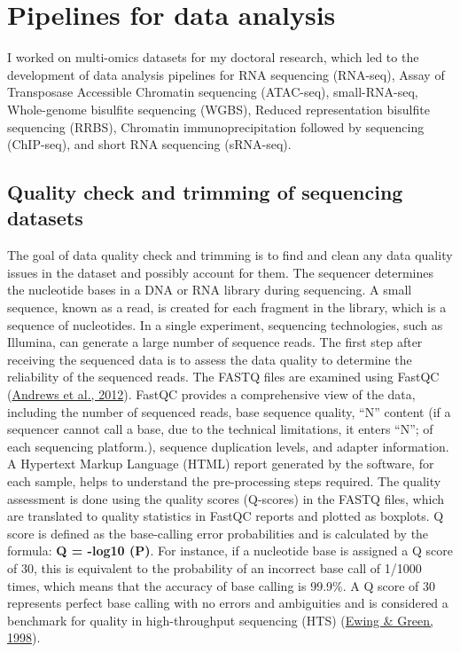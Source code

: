 \documentclass[12pt,twoside]{reedthesis}
\begin{document}
\hypertarget{m3}{%
\section*{Pipelines for data analysis}\label{m3}}

I worked on multi-omics datasets for my doctoral research, which led to
the development of data analysis pipelines for RNA sequencing (RNA-seq),
Assay of Transposase Accessible Chromatin sequencing (ATAC-seq),
small-RNA-seq, Whole-genome bisulfite sequencing (WGBS), Reduced
representation bisulfite sequencing (RRBS), Chromatin
immunoprecipitation followed by sequencing (ChIP-seq), and short RNA
sequencing (sRNA-seq).

\hypertarget{m3.1}{%
\subsection*{Quality check and trimming of sequencing datasets}\label{m3.1}}

The goal of data quality check and trimming is to find and clean any
data quality issues in the dataset and possibly account for them. The
sequencer determines the nucleotide bases in a DNA or RNA library during
sequencing. A small sequence, known as a read, is created for each
fragment in the library, which is a sequence of nucleotides. In a single
experiment, sequencing technologies, such as Illumina, can generate a
large number of sequence reads. The first step after receiving the
sequenced data is to assess the data quality to determine the
reliability of the sequenced reads. The FASTQ files are examined using
FastQC (\protect\hyperlink{ref-andrews2012}{Andrews et al., 2012}). FastQC provides a comprehensive view of the data,
including the number of sequenced reads, base sequence quality, ``N''
content (if a sequencer cannot call a base, due to the technical
limitations, it enters ``N''; of each sequencing platform.), sequence
duplication levels, and adapter information. A Hypertext Markup Language
(HTML) report generated by the software, for each sample, helps to
understand the pre-processing steps required. The quality assessment is
done using the quality scores (Q-scores) in the FASTQ files, which are
translated to quality statistics in FastQC reports and plotted as
boxplots. Q score is defined as the base-calling error probabilities and
is calculated by the formula: \textbf{Q = -log10 (P)}. For instance, if a
nucleotide base is assigned a Q score of 30, this is equivalent to the
probability of an incorrect base call of 1/1000 times, which means that
the accuracy of base calling is 99.9\%. A Q score of 30 represents
perfect base calling with no errors and ambiguities and is considered a
benchmark for quality in high-throughput sequencing (HTS) (\protect\hyperlink{ref-ewing1998}{Ewing \& Green, 1998}).
\end{document}
